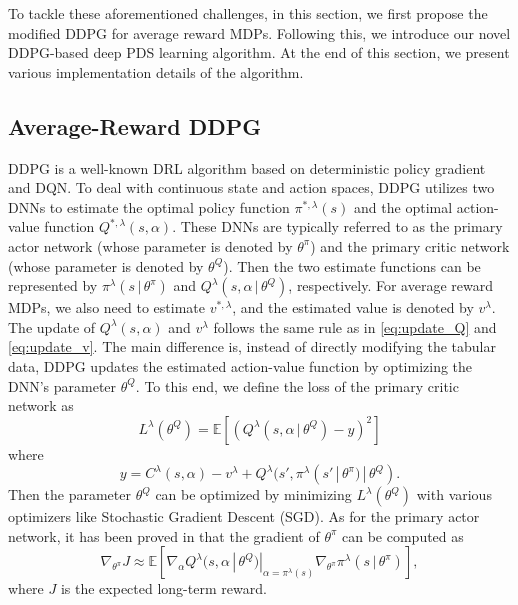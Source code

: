 \documentclass[lettersize, journal]{IEEEtran}
\begin{document}
To tackle these aforementioned challenges, in this section, we first propose the modified DDPG for average reward MDPs. 
Following this, we introduce our novel DDPG-based deep PDS learning algorithm. 
At the end of this section, we present various implementation details of the algorithm.

\subsection{Average-Reward DDPG} \label{subsection:a_ddpg}
DDPG is a well-known DRL algorithm based on deterministic policy gradient and DQN. To deal with continuous state and action spaces, DDPG utilizes 
two DNNs to estimate the optimal policy function 
$\pi^{*,\lambda}(s)$ and the optimal action-value function $Q^{*,\lambda}(s,\alpha)$. These DNNs are typically referred to as the primary actor network (whose parameter is denoted by $\theta^{\pi}$) and the primary critic network (whose parameter is denoted by $\theta^Q$).
Then the two estimate functions can be represented by $\pi^{\lambda}(s\, | \, \theta^{\pi})$ and 
$Q^{\lambda}(s,\alpha\, | \, \theta^Q)$, respectively.
For average reward MDPs, we also need to estimate $v^{*,\lambda}$, and the estimated value is denoted by $v^{\lambda}$.
The update of $Q^{\lambda}(s,\alpha)$ and $v^{\lambda}$ follows the same rule as in \eqref{eq:update_Q} and \eqref{eq:update_v}.
The main difference is, instead of directly modifying the tabular data, DDPG updates the estimated action-value function
by optimizing the DNN's parameter $\theta^Q$.
To this end, we define the loss of the primary critic network as
\begin{equation*}
    L^{\lambda}(\theta^Q) = \mathbb{E} \left[ \left( Q^{\lambda}(s,\alpha \, | \, \theta^Q) - y \right)^2 \right]
\end{equation*}
where
\begin{equation}
    y = C^{\lambda}(s,\alpha) - v^{\lambda} + Q^{\lambda}(s', \pi^{\lambda}(s' \, | \, \theta^{\pi}) \, | \, \theta^Q).
    \label{eq:y}
\end{equation}
Then the parameter $\theta^Q$ can be optimized by minimizing $L^{\lambda}(\theta^Q)$ with various optimizers like Stochastic Gradient Descent (SGD).
As for the primary actor network, it has been proved in \cite{silver2014deterministic} that the gradient of $\theta^{\pi}$
can be computed as 
\begin{equation}
    \nabla_{\theta^{\pi}}J \approx \mathbb{E} \left[ \nabla_{\alpha} Q^{\lambda}(s, \alpha \, | \, \theta^Q)|_{\alpha=\pi^{\lambda}(s)}
    \nabla_{\theta^{\pi}} \pi^{\lambda}(s \, | \, \theta^{\pi}) \right],
    \label{eq:actor_update}
\end{equation}
where $J$ is the expected long-term reward.
\end{document}
